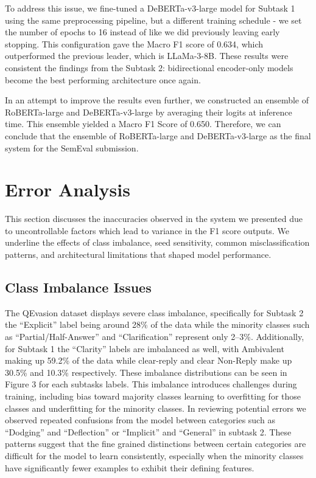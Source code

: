 \documentclass[11pt]{article}
\begin{document}
To address this issue, we fine-tuned a DeBERTa-v3-large \cite{DeBERTaV3} model for Subtask 1 using the same preprocessing pipeline, but a different training schedule - we set the number of epochs to 16 instead of like we did previously leaving early stopping. This configuration gave the Macro F1 score of 0.634, which outperformed the previous leader, which is LLaMa-3-8B. These results were consistent the findings from the Subtask 2: bidirectional encoder-only models become the best performing architecture once again.

In an attempt to improve the results even further, we constructed an ensemble of RoBERTa-large \cite{liu2020roberta} and DeBERTa-v3-large \cite{DeBERTaV3} by averaging their logits at inference time. This ensemble yielded a Macro F1 Score of 0.650. Therefore, we can conclude that the ensemble of RoBERTa-large \cite{liu2020roberta} and DeBERTa-v3-large \cite{DeBERTaV3} as the final system for the SemEval submission.

\section{Error Analysis}
This section discusses the inaccuracies observed in the system we presented due to uncontrollable factors which lead to variance in the F1 score outputs. We underline the effects of class imbalance, seed sensitivity, common misclassification patterns, and architectural limitations that shaped model performance.

\subsection{Class Imbalance Issues}
The QEvasion dataset displays severe class imbalance, specifically for Subtask 2 the “Explicit” label being around 28\% of the data while the minority classes such as “Partial/Half-Answer” and “Clarification” represent only 2–3\%. Additionally, for Subtask 1 the “Clarity” labels are imbalanced as well, with Ambivalent making up 59.2\% of the data while clear-reply and clear Non-Reply make up 30.5\% and 10.3\% respectively. These imbalance distributions can be seen in Figure 3 for each subtasks labels. This imbalance introduces challenges during training, including bias toward majority classes learning to overfitting for those classes and underfitting for the minority classes. In reviewing potential errors we observed repeated confusions from the model between categories such as “Dodging” and “Deflection” or “Implicit” and “General” in subtask 2. These patterns suggest that the fine grained distinctions between certain categories are difficult for the model to learn consistently, especially when the minority classes have significantly fewer examples to exhibit their defining features.
\end{document}
